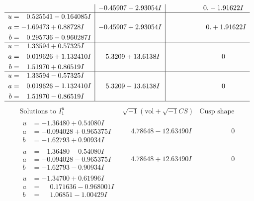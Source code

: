 \documentclass[1p]{elsarticle_modified}
\theoremstyle{definition}
\newcommand{\I}{\sqrt{-1}}
\begin{document}
$$\begin{array}{c|c|c}
 & -0.45907 - 2.93054 I & \phantom{-0.000000 } 0. - 1.91622 I \\ \hline\begin{aligned}
u &= \phantom{-}0.525541 - 0.164085 I \\
a &= -1.69473 + 0.88728 I \\
b &= \phantom{-}0.295736 - 0.960287 I\end{aligned}
 & -0.45907 + 2.93054 I & \phantom{-0.000000 -}0. + 1.91622 I \\ \hline\begin{aligned}
u &= \phantom{-}1.33594 + 0.57325 I \\
a &= \phantom{-}0.019626 + 1.132410 I \\
b &= \phantom{-}1.51970 + 0.86519 I\end{aligned}
 & \phantom{-}5.3209 + 13.6138 I & \phantom{-0.000000 } 0 \\ \hline\begin{aligned}
u &= \phantom{-}1.33594 - 0.57325 I \\
a &= \phantom{-}0.019626 - 1.132410 I \\
b &= \phantom{-}1.51970 - 0.86519 I\end{aligned}
 & \phantom{-}5.3209 - 13.6138 I & \phantom{-0.000000 } 0\\
 \hline 
 \end{array}$$\newpage$$\begin{array}{c|c|c}  
\text{Solutions to }I^u_{1}& \I (\text{vol} + \sqrt{-1}CS) & \text{Cusp shape}\\
 \hline 
\begin{aligned}
u &= -1.36480 + 0.54080 I \\
a &= -0.094028 + 0.965375 I \\
b &= -1.62793 + 0.90934 I\end{aligned}
 & \phantom{-}4.78648 - 12.63490 I & \phantom{-0.000000 } 0 \\ \hline\begin{aligned}
u &= -1.36480 - 0.54080 I \\
a &= -0.094028 - 0.965375 I \\
b &= -1.62793 - 0.90934 I\end{aligned}
 & \phantom{-}4.78648 + 12.63490 I & \phantom{-0.000000 } 0 \\ \hline\begin{aligned}
u &= -1.34700 + 0.61996 I \\
a &= \phantom{-}0.171636 - 0.968001 I \\
b &= \phantom{-}1.06851 - 1.00429 I\end{aligned}

\end{array}$$
\end{document}
